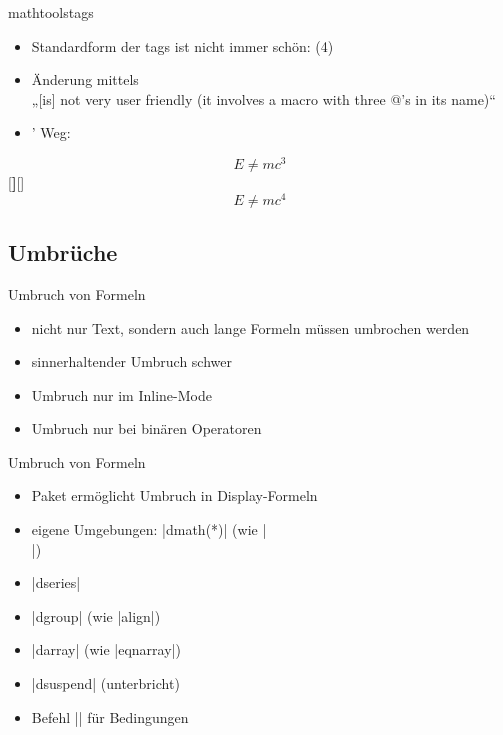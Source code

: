 \documentclass[
	vorläufig=false,
	datum=2018-11-12,
	titel={Mathematiksatz II},
	web=true,
	max,
	aspectratio=1610,
]{../tex/latexkurs-slides}
\begin{document}
\begin{frame}[fragile]{mathtools}{tags}
\begin{itemize}
\item Standardform der tags ist nicht immer schön: (4)
\item Änderung mittels \\%
„[is] not very user friendly (it involves a macro with three @’s in its name)“
\item {}’ Weg:
\end{itemize} 
\begin{LTXexample}[width=.3\textwidth]
\begin{equation}E \neq mc^3\end{equation}
[\textbf]{[}{]}
\begin{equation}E \neq mc^4\end{equation}
\end{LTXexample}
\end{frame}


\subsection{Umbrüche}
\begin{frame}{Umbruch von Formeln}
\begin{itemize}
\item nicht nur Text, sondern auch lange Formeln müssen umbrochen werden
\item sinnerhaltender Umbruch schwer
\item Umbruch nur im Inline-Mode
\item Umbruch nur bei binären Operatoren
\end{itemize}
\end{frame}

\begin{frame}[fragile]{Umbruch von Formeln}
\begin{itemize}
\item Paket  ermöglicht Umbruch in Display-Formeln
\item eigene Umgebungen: |dmath(*)| (wie |\[ \]|)
\item |dseries| 
\item |dgroup| (wie |align|)
\item |darray| (wie |eqnarray|)
\item |dsuspend| (unterbricht)
\item Befehl |\condition| für Bedingungen
\end{itemize}
\end{frame}
\end{document}
